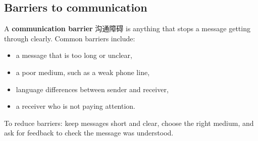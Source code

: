 \documentclass[11pt]{article}
\begin{document}
\subsection*{Barriers to communication}

A \textbf{communication barrier} 沟通障碍 is anything that stops a message getting through clearly. Common barriers include:

\begin{itemize}
\item a message that is too long or unclear,

\item a poor medium, such as a weak phone line,

\item language differences between sender and receiver,

\item a receiver who is not paying attention.

\end{itemize}

To reduce barriers: keep messages short and clear, choose the right medium, and ask for feedback to check the message was understood.
\end{document}
